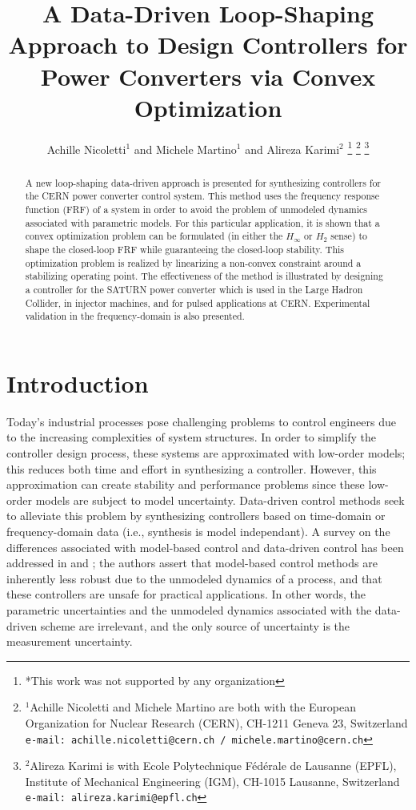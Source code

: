 \documentclass[a4paper, 10pt, conference]{ieeeconf}
\title{A Data-Driven Loop-Shaping Approach to Design Controllers for Power Converters via Convex Optimization}
\author{Achille Nicoletti$^{1}$ and Michele Martino$^{1}$ and Alireza Karimi$^{2}$%
\thanks{*This work was not supported by any organization}%
\thanks{$^{1}$Achille Nicoletti and Michele Martino are both with the European Organization for Nuclear Research (CERN), 
 CH-1211 Geneva 23, Switzerland
        {\tt\small  e-mail: achille.nicoletti@cern.ch / michele.martino@cern.ch}}%
\thanks{$^{2}$Alireza Karimi is with Ecole Polytechnique F\'{e}d\'{e}rale de Lausanne (EPFL), Institute of Mechanical Engineering (IGM),
   CH-1015 Lausanne, Switzerland
        {\tt\small e-mail: alireza.karimi@epfl.ch}}%
}
\begin{document}
\maketitle
\thispagestyle{empty}
\pagestyle{empty}

\begin{abstract}                %
A new loop-shaping data-driven approach is presented for synthesizing controllers for the CERN power converter control system. This method uses the frequency response function (FRF) of a system in order to avoid the problem of unmodeled dynamics associated with parametric models. For this particular application, it is shown that a convex optimization problem can be formulated (in either the $H_\infty$ or $H_2$ sense) to shape the closed-loop FRF while guaranteeing the closed-loop stability. This optimization problem is realized by linearizing a non-convex constraint around a stabilizing operating point. The effectiveness of the method is illustrated by designing a controller for the SATURN power converter which is used in the Large Hadron Collider, in injector machines, and for pulsed applications at CERN. Experimental validation in the frequency-domain is also presented. 
\end{abstract}


\section{Introduction}
Today's industrial processes pose challenging problems to control engineers due to the increasing complexities of system structures. In order to simplify the controller design process, these systems are approximated with low-order models; this reduces both time and effort in synthesizing a controller. However, this approximation can create stability and performance problems since these low-order models are subject to model uncertainty. Data-driven control methods seek to alleviate this problem by synthesizing controllers based on time-domain or frequency-domain data (i.e., synthesis is model independant). A survey on the differences associated with model-based control and data-driven control has been addressed in \cite{HW13} and \cite{BCE12}; the authors assert that model-based control methods are inherently less robust due to the unmodeled dynamics of a process, and that these controllers are unsafe for practical applications. In other words, the parametric uncertainties and the unmodeled dynamics associated with the data-driven scheme are irrelevant, and the only source of uncertainty is the measurement uncertainty. 
\end{document}
